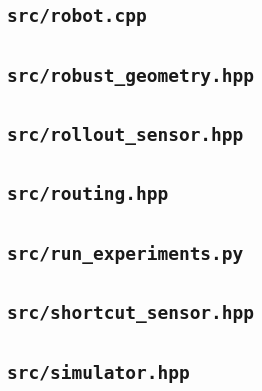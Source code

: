 \subsection*{\texttt{src/robot.cpp}}

\subsection*{\texttt{src/robust\_geometry.hpp}}

\subsection*{\texttt{src/rollout\_sensor.hpp}}

\subsection*{\texttt{src/routing.hpp}}

\subsection*{\texttt{src/run\_experiments.py}}

\subsection*{\texttt{src/shortcut\_sensor.hpp}}

\subsection*{\texttt{src/simulator.hpp}}

